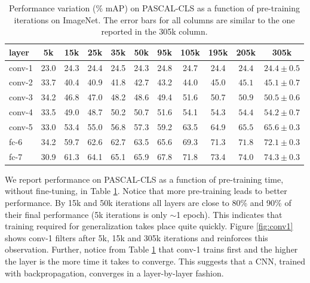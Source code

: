 \setlength{\tabcolsep}{4pt}
\begin{table}[t!]
\begin{center}
\caption{Performance variation (\% mAP) on PASCAL-CLS as a function of pre-training iterations on ImageNet. The error bars  for all columns are similar to the one reported in the 305k column.}
\label{table:det-traj-classify}
\vspace{0.3em}
\begin{tabular}{lcccccccccc}
layer  & 5k & 15k & 25k & 35k & 50k & 95k & 105k & 195k & 205k & 305k \\
\hline
conv-1 & 23.0 & 24.3 & 24.4 & 24.5 & 24.3 & 24.8 & 24.7 & 24.4 & $24.4$  & $24.4 \pm 0.5$ \\
conv-2 & 33.7 & 40.4 & 40.9 & 41.8 & 42.7 & 43.2 & 44.0 & 45.0 & $45.1$  & $45.1 \pm 0.7$ \\
conv-3 & 34.2 & 46.8 & 47.0 & 48.2 & 48.6 & 49.4 & 51.6 & 50.7 & $50.9$  & $50.5 \pm 0.6$ \\
conv-4 & 33.5 & 49.0 & 48.7 & 50.2 & 50.7 & 51.6 & 54.1 & 54.3 & $54.4$  & $54.2 \pm 0.7$ \\
conv-5 & 33.0 & 53.4 & 55.0 & 56.8 & 57.3 & 59.2 & 63.5 & 64.9 & $65.5$  & $65.6 \pm 0.3 $ \\
fc-6   & 34.2 & 59.7 & 62.6 & 62.7 & 63.5 & 65.6 & 69.3 & 71.3 & $71.8$  & $72.1 \pm 0.3 $\\
fc-7   & 30.9 & 61.3 & 64.1 & 65.1 & 65.9 & 67.8 & 71.8 & 73.4 & $74.0$  & $74.3 \pm 0.3 $\\
\end{tabular}
\end{center}
\end{table}
\setlength{\tabcolsep}{1.4pt}

We report performance on PASCAL-CLS as a function of pre-training time, without fine-tuning, in Table \ref{table:det-traj-classify}. Notice that more pre-training leads to better performance. By 15k and 50k iterations all layers are close to 80\% and  90\% of their final performance (5k iterations is only $\sim$1 epoch). This indicates that training required for generalization takes place quite quickly. Figure \ref{fig:conv1} shows conv-1 filters after 5k, 15k and 305k iterations and reinforces this observation. Further, notice from Table \ref{table:det-traj-classify} that conv-1 trains first and the higher the layer is the more time it takes to converge. This suggests that a CNN, trained with backpropagation, converges in a layer-by-layer fashion.   

